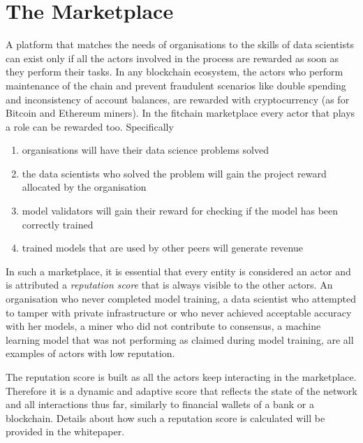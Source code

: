\documentclass[12pt, a4paper,titlepage]{extreport}
\begin{document}
\section{The Marketplace}
A platform that matches the needs of organisations to the skills of data scientists can exist only if all the actors involved in the process are rewarded as soon as they perform their tasks. In any blockchain ecosystem, the actors who perform maintenance of the chain and prevent fraudulent scenarios like double spending and inconsistency of account balances, are rewarded with cryptocurrency (as for Bitcoin and Ethereum miners). 
In the fitchain marketplace every actor that plays a role can be rewarded too. Specifically

\begin{enumerate}
\item organisations will have their data science problems solved
\item the data scientists who solved the problem will gain the project reward allocated by the organisation
\item model validators will gain their reward for checking if the model has been correctly trained
\item trained models that are used by other peers will generate revenue
\end{enumerate}

In such a marketplace, it is essential that every entity is considered an actor and is attributed a \textit{reputation score} that is always visible to the other actors. 
An organisation who never completed model training, a data scientist who attempted to tamper with private infrastructure or who never achieved acceptable accuracy with her models, a miner who did not contribute to consensus, a machine learning model that was not performing as claimed during model training, are all examples of actors with low reputation.

The reputation score is built as all the actors keep interacting in the marketplace. Therefore it is a dynamic and adaptive score that reflects the state of the network and all interactions thus far, similarly to financial wallets of a bank or a blockchain. 
Details about how such a reputation score is calculated will be provided in the whitepaper.


\pagebreak 
\end{document}
